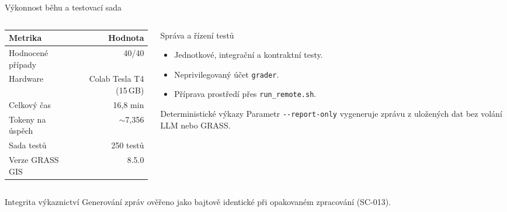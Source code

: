 \documentclass[aspectratio=169,11pt]{beamer}
\begin{document}
\begin{frame}[t]{Výkonnost běhu a testovací sada}
  \small
  \begin{columns}[T,onlytextwidth]
    \begin{column}{0.50\textwidth}
      \begin{table}
        \centering
        \begin{tabular}{@{}lr@{}}
          \toprule
          \textbf{Metrika} & \textbf{Hodnota} \\
          \midrule
          Hodnocené případy & 40/40 \\
          Hardware & Colab Tesla T4 (15\,GB) \\
          Celkový čas & 16,8 min \\
          Tokeny na úspěch & $\sim$7{,}356 \\
          Sada testů & 250 testů \\
          Verze GRASS GIS & 8.5.0 \\
          \bottomrule
        \end{tabular}
      \end{table}
    \end{column}

    \begin{column}{0.48\textwidth}
      \begin{block}{Správa a řízení testů}
        \begin{itemize}
          \item Jednotkové, integrační a kontraktní testy.
          \item Neprivilegovaný účet \texttt{grader}.
          \item Příprava prostředí přes \texttt{run\_remote.sh}.
        \end{itemize}
      \end{block}

      \begin{block}{Deterministické výkazy}
        Parametr \texttt{-{}-report-only} vygeneruje zprávu z uložených dat bez
        volání LLM nebo GRASS.
      \end{block}
    \end{column}
  \end{columns}

  \begin{exampleblock}{Integrita výkaznictví}
    Generování zpráv ověřeno jako bajtově identické při opakovaném zpracování
    (SC-013).
  \end{exampleblock}
\end{frame}
\end{document}

